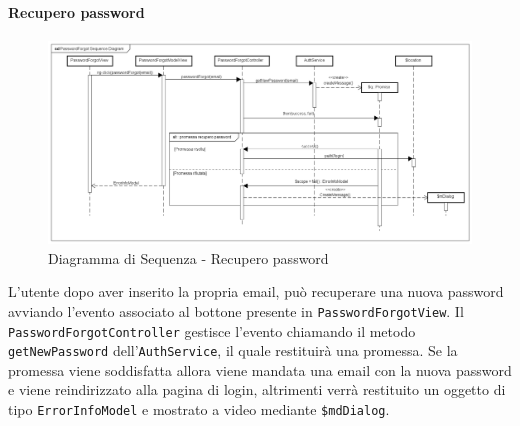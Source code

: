 \paragraph{Recupero password}

\label{Diagramma di Sequenza - Recupero password}

\begin{figure}[ht]
	\centering
	\includegraphics[scale=0.4,keepaspectratio]{UML/DiagrammiDiSequenza/Front-end/PasswordForgot.png}
	\caption{Diagramma di Sequenza - Recupero password}
\end{figure} \FloatBarrier

L'utente dopo aver inserito la propria email, può recuperare una nuova password avviando l'evento associato al bottone presente in \texttt{PasswordForgotView}. Il \texttt{PasswordForgotController} gestisce l'evento chiamando il metodo \texttt{getNewPassword} dell'\texttt{AuthService}, il quale restituirà una promessa. Se la promessa viene soddisfatta allora viene mandata una email con la nuova password e viene reindirizzato alla pagina di login, altrimenti verrà restituito un oggetto di tipo \texttt{ErrorInfoModel} e mostrato a video mediante \texttt{\$mdDialog}. 